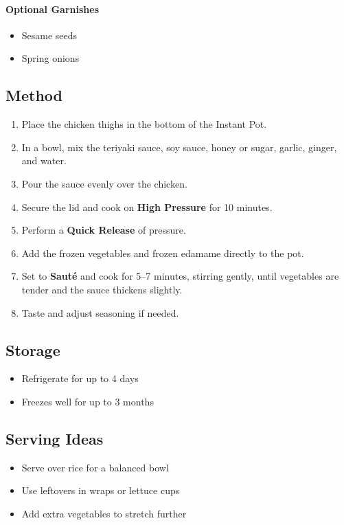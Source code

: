 \documentclass[11pt,a4paper]{article}
\begin{document}
\paragraph{Optional Garnishes}
\begin{itemize}
    \item Sesame seeds
    \item Spring onions
\end{itemize}

\vspace{0.5em}

\subsection*{Method}
\begin{enumerate}
    \item Place the chicken thighs in the bottom of the Instant Pot.
    \item In a bowl, mix the teriyaki sauce, soy sauce, honey or sugar, garlic, ginger, and water.
    \item Pour the sauce evenly over the chicken.
    \item Secure the lid and cook on \textbf{High Pressure} for 10 minutes.
    \item Perform a \textbf{Quick Release} of pressure.
    \item Add the frozen vegetables and frozen edamame directly to the pot.
    \item Set to \textbf{Sauté} and cook for 5--7 minutes, stirring gently, until vegetables are tender and the sauce thickens slightly.
    \item Taste and adjust seasoning if needed.
\end{enumerate}

\vspace{0.5em}

\subsection*{Storage}
\begin{itemize}
    \item Refrigerate for up to 4 days
    \item Freezes well for up to 3 months
\end{itemize}

\vspace{0.5em}

\subsection*{Serving Ideas}
\begin{itemize}
    \item Serve over rice for a balanced bowl
    \item Use leftovers in wraps or lettuce cups
    \item Add extra vegetables to stretch further
\end{itemize}
\end{document}
